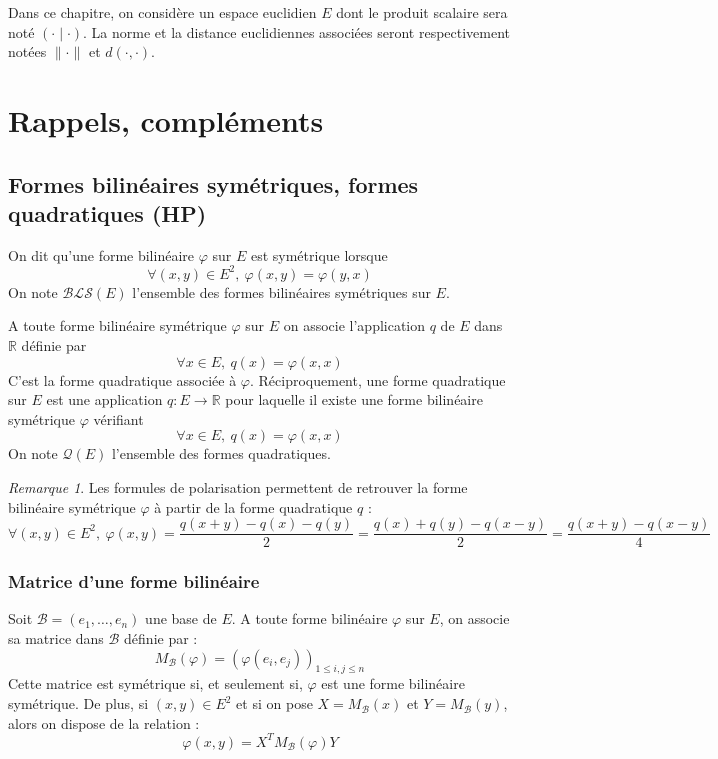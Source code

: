 \documentclass[french]{article}
\newcommand{\R}{\mathbb{R}}
\theoremstyle{plain}
\theoremstyle{definition}
\theoremstyle{remark}
\newtheorem*{rmq}{Remarque}
\begin{document}
Dans ce chapitre, on considère un espace euclidien $E$ dont le produit scalaire sera noté $(\cdot\mid\cdot)$. La norme et la distance euclidiennes associées seront respectivement notées $\lVert\cdot\rVert$ et $d(\cdot,\cdot)$.

\section{Rappels, compléments}

\subsection{Formes bilinéaires symétriques, formes quadratiques (HP)}

\begin{dfn}
	On dit qu'une forme bilinéaire $\varphi$ sur $E$ est symétrique lorsque $$\forall (x,y)\in E^2,\ \varphi(x,y)=\varphi(y,x)$$ On note $\mathcal{BLS}(E)$ l'ensemble des formes bilinéaires symétriques sur $E$.
\end{dfn}

\begin{dfn}
	A toute forme bilinéaire symétrique $\varphi$ sur $E$ on associe l'application $q$ de $E$ dans $\R$ définie par $$\forall x\in E,\ q(x)=\varphi(x,x)$$ C'est la forme quadratique associée à $\varphi$. Réciproquement, une forme quadratique sur $E$ est une application $q:E\to\R$ pour laquelle il existe une forme bilinéaire symétrique $\varphi$ vérifiant $$\forall x\in E,\ q(x)=\varphi(x,x)$$ On note $\mathcal{Q}(E)$ l'ensemble des formes quadratiques.
\end{dfn}

\begin{rmq}
	Les formules de polarisation permettent de retrouver la forme bilinéaire symétrique $\varphi$ à partir de la forme quadratique $q$ : $$\forall (x,y)\in E^2,\ \varphi(x,y)=\frac{q(x+y)-q(x)-q(y)}{2}=\frac{q(x)+q(y)-q(x-y)}{2}=\frac{q(x+y)-q(x-y)}{4}$$
\end{rmq}

\subsubsection*{Matrice d'une forme bilinéaire}
Soit $\mathcal{B}=(e_1,\ldots,e_n)$ une base de $E$. A toute forme bilinéaire $\varphi$ sur $E$, on associe sa matrice dans $\mathcal{B}$ définie par : $$M_\mathcal{B}(\varphi)=\left(\varphi(e_i,e_j)\right)_{1\leqslant i,j\leqslant n}$$ Cette matrice est symétrique si, et seulement si, $\varphi$ est une forme bilinéaire symétrique. De plus, si $(x,y)\in E^2$ et si on pose $X=M_\mathcal{B}(x)$ et $Y=M_\mathcal{B}(y)$, alors on dispose de la relation : $$\varphi(x,y)=X^TM_\mathcal{B}(\varphi)Y$$
\end{document}
